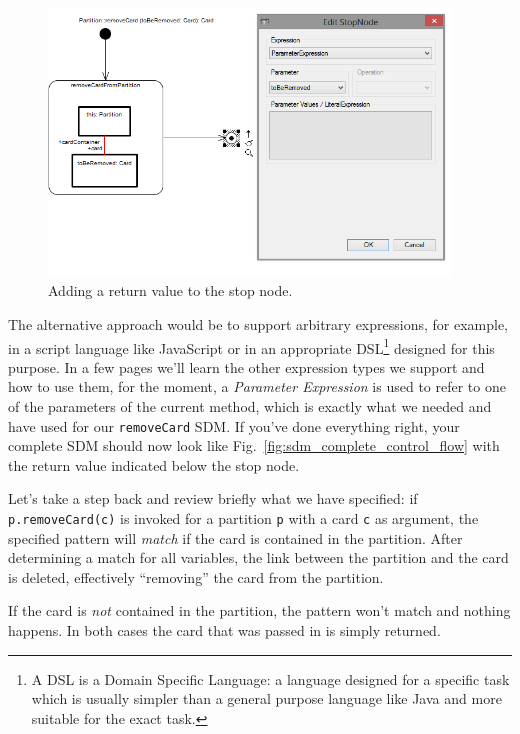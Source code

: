 \begin{figure}[htp]
\begin{center}
  \includegraphics[width=0.95\textwidth]{pics/sdmBilder/removeCard/sdm14RAW.png}
  \caption{Adding a return value to the stop node.}  
  \label{fig:stop_node_return_value}
\end{center}
\end{figure}

The alternative approach would be to support arbitrary expressions, for example, in a script language like JavaScript or in an appropriate DSL\footnote{A DSL is a Domain Specific Language: a language designed for a specific task which is usually simpler than a general purpose language like Java and more suitable for the exact task.} designed for this purpose. 
In a few pages we'll learn the other expression types
we support and how to use them, for the moment, a \emph{Parameter Expression} is used to refer to one of the parameters of the current method, which is exactly what we needed and have used for our \texttt{removeCard} SDM.
If you've done everything right, your complete SDM should now look like Fig.~\ref{fig:sdm_complete_control_flow} with the return value indicated below the stop node.

Let's take a step back and review briefly what we have specified:  if \texttt{p.remove\-Card(c)} is invoked for a partition \texttt{p} with a card \texttt{c} as argument, the specified pattern will \emph{match} if the card is contained in the partition.
After determining a match for all variables, the link between the partition and the card is deleted, effectively ``removing'' the card from the partition.  

If the card is \emph{not} contained in the partition, the pattern won't match and nothing happens. 
In both cases the card that was passed in is simply returned.


